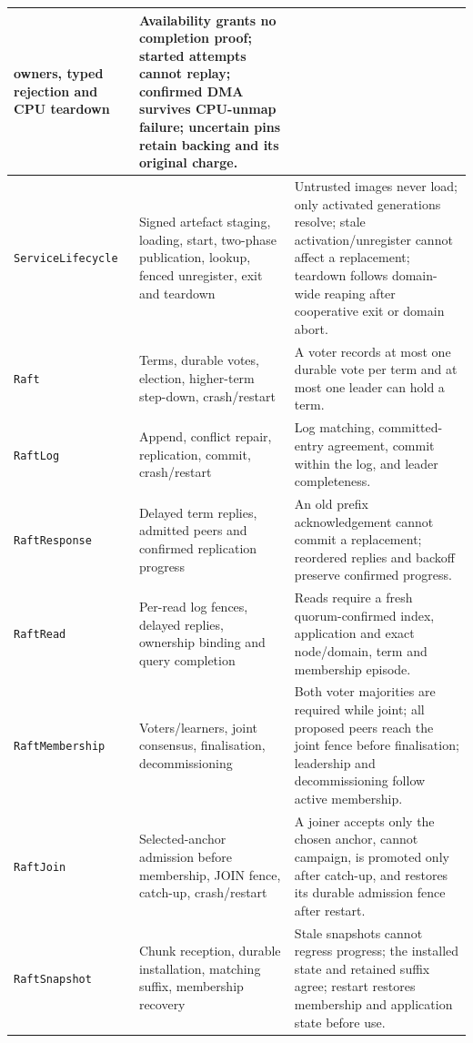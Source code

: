 \begin{longtable}{|p{}|p{}|p{}|}
    owners, typed rejection and CPU teardown & Availability grants no completion
    proof; started attempts cannot replay; confirmed DMA survives CPU-unmap
    failure; uncertain pins retain backing and its original charge. \\
\hline
\texttt{ServiceLifecycle} & Signed artefact staging, loading, start,
    two-phase publication, lookup, fenced unregister, exit and teardown &
    Untrusted images never load; only activated generations resolve; stale
    activation/unregister cannot affect a replacement; teardown follows
    domain-wide reaping after cooperative exit or domain abort. \\
\hline
\texttt{Raft} & Terms, durable votes, election, higher-term step-down,
    crash/restart & A voter records at most one durable vote per term and at
    most one leader can hold a term. \\
\hline
\texttt{RaftLog} & Append, conflict repair, replication, commit,
    crash/restart & Log matching, committed-entry agreement, commit within the
    log, and leader completeness. \\
\hline
\texttt{RaftResponse} & Delayed term replies, admitted peers and
    confirmed replication progress & An old prefix acknowledgement cannot commit
    a replacement; reordered replies and backoff preserve confirmed progress. \\
\hline
\texttt{RaftRead} & Per-read log fences, delayed replies, ownership
    binding and query completion & Reads require a fresh quorum-confirmed index,
    application and exact node/domain, term and membership episode. \\
\hline
\texttt{RaftMembership} & Voters/learners, joint consensus,
    finalisation, decommissioning & Both voter majorities are required while
    joint; all proposed peers reach the joint fence before finalisation;
    leadership and decommissioning follow active membership. \\
\hline
\texttt{RaftJoin} & Selected-anchor admission before membership,
    JOIN fence, catch-up, crash/restart & A joiner accepts only the chosen
    anchor, cannot campaign, is promoted only after catch-up, and restores its
    durable admission fence after restart. \\
\hline
\texttt{RaftSnapshot} & Chunk reception, durable installation,
    matching suffix, membership recovery & Stale snapshots cannot regress
    progress; the installed state and retained suffix agree; restart restores
    membership and application state before use. \\

\end{longtable}
